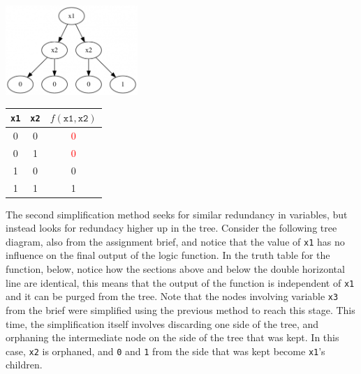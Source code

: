 \documentclass[12pt]{article}
\begin{document}
    \begin{minipage}{\linewidth}
        \begin{multicols}{2}
            \begin{center} \null \vfill %
                \includegraphics[width=5cm, interpolate]{rsc/bt1.png}
                \parbox{\linewidth}{} 

                \columnbreak
                \null \vfill

                \begin{tabular}[t]{ c|c|c }
                    \texttt{x1} & \texttt{x2}   & $f(\texttt{x1},\texttt{x2})$ \\ \hline
                    0           & 0             & \textcolor{red}{0} \\
                    0           & 1             & \textcolor{red}{0} \\
                    1           & 0             & 0 \\
                    1           & 1             & 1
                \end{tabular} \null \vspace{2ex}
                \parbox{\linewidth}{} 
            \end{center}
        \end{multicols}
    \end{minipage}

    The second simplification method seeks for similar redundancy in variables, but instead looks for redundacy higher up in the tree. Consider the following tree diagram, also from the assignment brief, and notice that the value of \texttt{x1} has no influence on the final output of the logic function.
    In the truth table for the function, below, notice how the sections above and below the double horizontal line are identical, this means that the output of the function is independent of \texttt{x1} and it can be purged from the tree. Note that the nodes involving variable \texttt{x3} from the brief were simplified using the previous method to reach this stage. This time, the simplification itself involves discarding one side of the tree, and orphaning the intermediate node on the side of the tree that was kept. In this case, \texttt{x2} is orphaned, and \texttt{0} and \texttt{1} from the side that was kept become \texttt{x1}'s children.
    
\end{document}
